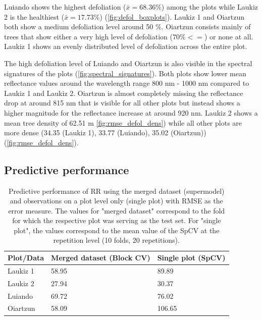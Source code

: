 \documentclass[review]{elsarticle}
\begin{document}
Luiando shows the highest defoliation ($\bar{x} = 68.36 \%$) among the plots while Laukiz 2 is the healthiest ($\bar{x} = 17.73 \%$) (\autoref{fig:defol_boxplots}).
Laukiz 1 and Oiartzun both show a medium defoliation level around 50 \%.
Oiartzun consists mainly of trees that show either a very high level of defoliation ($70 \% <=$) or none at all.
Laukiz 1 shows an evenly distributed level of defoliation across the entire plot.

The high defoliation level of Luiando and Oiartzun is also visible in the spectral signatures of the plots (\autoref{fig:spectral_signatures}).
Both plots show lower mean reflectance values around the wavelength range 800 nm - 1000 nm compared to Laukiz 1 and Laukiz 2.
Oiartzun is almost completely missing the reflectance drop at around 815 nm that is visible for all other plots but instead shows a higher magnitude for the reflectance increase at around 920 nm.
Laukiz 2 shows a mean tree density of 62.51 m \autoref{fig:rmse_defol_dens}) while all other plots are more dense (34.35 (Laukiz 1), 33.77 (Luiando), 35.02 (Oiartzun)) (\autoref{fig:rmse_defol_dens}).

\subsection{Predictive performance}

\begin{table}[t!]
\centering
\caption[t]{Predictive performance of \ac{RR} using the merged dataset (supermodel) and observations on a plot level only (single plot) with \ac{RMSE} as the error measure. The values for "merged dataset" correspond to the fold for which the respective plot was serving as the test set. For "single plot", the values correspond to the mean value of the SpCV at the repetition level (10 folds, 20 repetitions).}
\begingroup\footnotesize
\begin{tabular}{lll}
	\\
	Plot/Data & Merged dataset (Block CV) & Single plot (SpCV) \\
	\hline
	Laukiz 1  & 58.95                     & 89.89              \\
	Laukiz 2  & 27.94                     & 30.37              \\
	Luiando   & 69.72                     & 76.02              \\
	Oiartzun  & 58.09                     & 106.65             \\
	\bottomrule
\end{tabular}
\endgroup
\label{tab:supermodel_performance}
\end{table}
\end{document}
